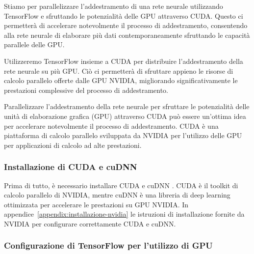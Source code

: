 \documentclass{article}
\begin{document}
Stiamo per parallelizzare l'addestramento di una rete neurale utilizzando TensorFlow e sfruttando le potenzialità delle GPU attraverso CUDA. Questo ci permetterà di accelerare notevolmente il processo di addestramento, consentendo alla rete neurale di elaborare più dati contemporaneamente sfruttando le capacità parallele delle GPU.

Utilizzeremo TensorFlow insieme a CUDA per distribuire l'addestramento della rete neurale su più GPU. Ciò ci permetterà di sfruttare appieno le risorse di calcolo parallelo offerte dalle GPU NVIDIA, migliorando significativamente le prestazioni complessive del processo di addestramento.

Parallelizzare l'addestramento della rete neurale per sfruttare le potenzialità delle unità di elaborazione grafica (GPU) attraverso CUDA può essere un'ottima idea per accelerare notevolmente il processo di addestramento. CUDA è una piattaforma di calcolo parallelo sviluppata da NVIDIA per l'utilizzo delle GPU per applicazioni di calcolo ad alte prestazioni.

\subsubsection{Installazione di CUDA e cuDNN}

Prima di tutto, è necessario installare CUDA e cuDNN . CUDA è il toolkit di calcolo parallelo di NVIDIA, mentre cuDNN è una libreria di deep learning ottimizzata per accelerare le prestazioni su GPU NVIDIA. In appendice~\ref{appendix:installazione-nvidia} le istruzioni di installazione fornite da NVIDIA per configurare correttamente CUDA e cuDNN.

\subsubsection{Configurazione di TensorFlow per l'utilizzo di GPU}
\end{document}
